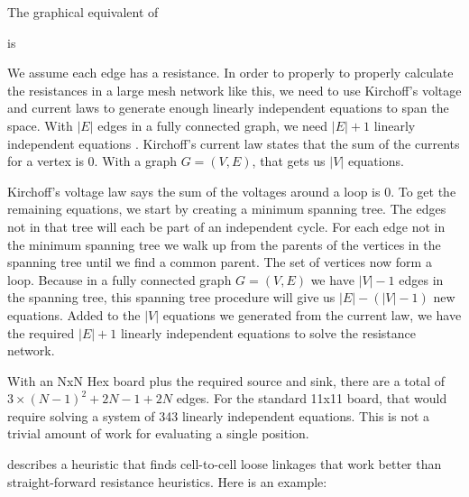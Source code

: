 \documentclass[12pt,titlepage]{amsart}
\begin{document}
The graphical equivalent of

\begin{HexBoard}[board size=5]
\end{HexBoard}

is


We assume each edge has a resistance. In order to properly to properly calculate
the resistances in a large mesh network like this, we need to use Kirchoff's
voltage and current laws to generate enough linearly independent equations to
span the space. With $|E|$ edges in a fully connected graph, we need $|E|+1$
linearly independent equations \cite{Moody2013}. Kirchoff's current law states
that the sum of the currents for a vertex is 0. With a graph $G=(V,E)$, that
gets us $|V|$ equations.

Kirchoff's voltage law says the sum of the voltages around a loop is 0. To get
the remaining equations, we start by creating a minimum spanning tree. The edges
not in that tree will each be part of an independent cycle. For each edge not in
the minimum spanning tree we walk up from the parents of the vertices in the
spanning tree until we find a common parent. The set of vertices now form a
loop. Because in a fully connected graph $G=(V,E)$ we have $|V|-1$ edges in the
spanning tree, this spanning tree procedure will give us $|E|-(|V|-1)$ new
equations. Added to the $|V|$ equations we generated from the current law, we
have the required $|E|+1$ linearly independent equations to solve the resistance
network.

With an NxN Hex board plus the required source and sink, there are a total of
$3\times(N-1)^2+2N-1 + 2N$ edges. For the standard 11x11 board, that would
require solving a system of 343 linearly independent equations. This is not a
trivial amount of work for evaluating a single position.

\cite{ANSHELEVICH2002101} describes a heuristic that finds cell-to-cell loose
linkages that work better than straight-forward resistance heuristics. Here is
an example:

\begin{HexBoard}[board size=5]
\end{HexBoard}
\end{document}
